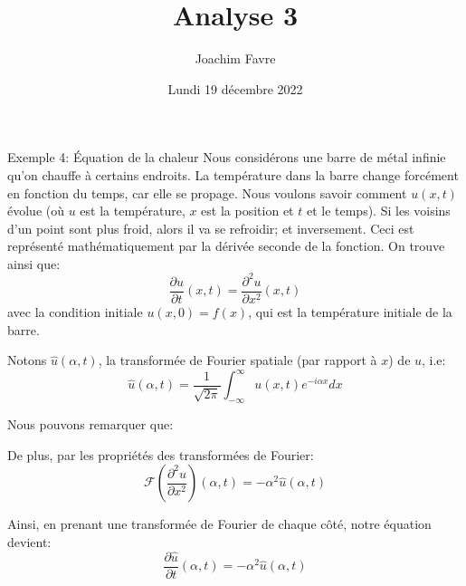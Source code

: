 \documentclass[a4paper]{article}
\title{Analyse 3}
\author{Joachim Favre}
\date{Lundi 19 décembre 2022}
\begin{document}
\maketitle


\begin{parag}{Exemple 4: Équation de la chaleur}
    Nous considérons une barre de métal infinie qu'on chauffe à certains endroits. La température dans la barre change forcément en fonction du temps, car elle se propage. Nous voulons savoir comment $u\left(x, t\right)$ évolue (où $u$ est la température, $x$ est la position et $t$ et le temps). Si les voisins d'un point sont plus froid, alors il va se refroidir; et inversement. Ceci est représenté mathématiquement par la dérivée seconde de la fonction. On trouve ainsi que:
    \[\frac{\partial u}{\partial t}\left(x, t\right) = \frac{\partial^2 u}{\partial x^2} \left(x, t\right) \]
    avec la condition initiale $u\left(x, 0\right) = f\left(x\right)$, qui est la température initiale de la barre.

    Notons $\hat{u}\left(\alpha, t\right)$, la transformée de Fourier spatiale (par rapport à $x$) de $u$, i.e: 
    \[\hat{u}\left(\alpha, t\right) = \frac{1}{\sqrt{2\pi}} \int_{-\infty}^{\infty} u\left(x, t\right) e^{-i\alpha x}dx\]
    
    Nous pouvons remarquer que: 
    
    De plus, par les propriétés des transformées de Fourier: 
    \[\mathcal{F}\left(\frac{\partial^2 u}{\partial x^2} \right)\left(\alpha, t\right) = -\alpha ^2 \hat{u}\left(\alpha, t\right)\]
    
    Ainsi, en prenant une transformée de Fourier de chaque côté, notre équation devient: 
    \[\frac{\partial \hat{u}}{\partial t} \left(\alpha, t\right) = -\alpha ^2 \hat{u}\left(\alpha, t\right)\]
    

\end{parag}
\end{document}
